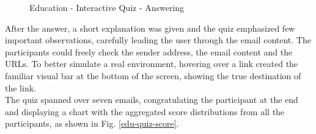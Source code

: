 \documentclass[a4paper]{article}
\begin{document}
\bigskip

\begin{figure}[H]
	\centering
	\caption{Education - Interactive Quiz - Answering}
	\label{edu-quiz-answer}
\end{figure}

\newpage

\noindent
After the answer, a short explanation was given and the quiz emphasized few important observations, carefully leading the user through the email content. The participants could freely check the sender address, the email content and the URLs. To better simulate a real environment, hovering over a link created the familiar visual bar at the bottom of the screen, showing the true destination of the link.
\\
The quiz spanned over seven emails, congratulating the participant at the end and displaying a chart with the aggregated score distributions from all the participants, as shown in Fig. \ref{edu-quiz-score}.

\bigskip
\end{document}
